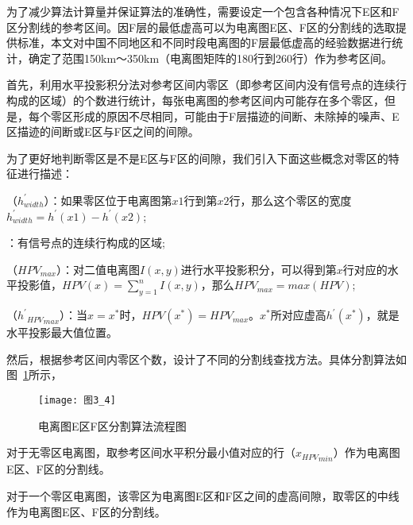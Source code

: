 为了减少算法计算量并保证算法的准确性，需要设定一个包含各种情况下E区和F区分割线的参考区间。因F层的最低虚高可以为电离图E区、F区的分割线的选取提供标准，本文对中国不同地区和不同时段电离图的F层最低虚高的经验数据进行统计，确定了范围150km～350km（电离图矩阵的180行到260行）作为参考区间。
         
首先，利用水平投影积分法对参考区间内零区（即参考区间内没有信号点的连续行构成的区域）的个数进行统计，每张电离图的参考区间内可能存在多个零区，但是，每个零区形成的原因不尽相同，可能由于F层描迹的间断、未除掉的噪声、E区描迹的间断或E区与F区之间的间隙。
         
为了更好地判断零区是不是E区与F区的间隙，我们引入下面这些概念对零区的特征进行描述：
\begin{enumerate}          
（$h_{width}^{'}$）：如果零区位于电离图第$x1$行到第$x2$行，那么这个零区的宽度$h_{width}^{'}=h^{'}(x1)-h^{'}(x2)$;
         
：有信号点的连续行构成的区域;
         
（${HPV}_{max}$）：对二值电离图$I(x,y)$进行水平投影积分，可以得到第$x$行对应的水平投影值，$HPV(x)=\sum_{y=1}^{n}I(x,y)$，那么$HPV_{max}=max(HPV)$;
         
（${{h^{'}}_{HPV}}_{max}$）：当$x=x^{*}$时，$HPV(x^{*})={HPV}_{max}$。$x^{*}$所对应虚高$h^{'}(x^{*})$，就是水平投影最大值位置。
\end{enumerate}    
      
然后，根据参考区间内零区个数，设计了不同的分割线查找方法。具体分割算法如图~\ref{图3_4}所示，

\begin{figure}[h]
\centering
\texttt{[image: 图3\_4]}
\caption{电离图E区F区分割算法流程图}
\label{图3_4}    
\end{figure}
  
对于无零区电离图，取参考区间水平积分最小值对应的行（${x_{HPV}}_{min}$）作为电离图E区、F区的分割线。         
	 
对于一个零区电离图，该零区为电离图E区和F区之间的虚高间隙，取零区的中线作为电离图E区、F区的分割线。
	 
